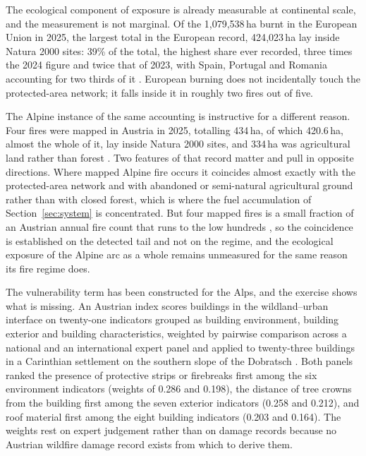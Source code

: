 \documentclass[11pt,a4paper]{article}
\begin{document}
The ecological component of exposure is already measurable at continental scale, and the measurement is not marginal. Of the 1{,}079{,}538\,ha burnt in the European Union in 2025, the largest total in the European record, 424{,}023\,ha lay inside Natura 2000 sites: 39\% of the total, the highest share ever recorded, three times the 2024 figure and twice that of 2023, with Spain, Portugal and Romania accounting for two thirds of it \citep{jrc_advance_2026}. European burning does not incidentally touch the protected-area network; it falls inside it in roughly two fires out of five.

The Alpine instance of the same accounting is instructive for a different reason. Four fires were mapped in Austria in 2025, totalling 434\,ha, of which 420.6\,ha, almost the whole of it, lay inside Natura 2000 sites, and 334\,ha was agricultural land rather than forest \citep{jrc_advance_2026}. Two features of that record matter and pull in opposite directions. Where mapped Alpine fire occurs it coincides almost exactly with the protected-area network and with abandoned or semi-natural agricultural ground rather than with closed forest, which is where the fuel accumulation of Section~\ref{sec:system} is concentrated. But four mapped fires is a small fraction of an Austrian annual fire count that runs to the low hundreds \citep{papathomakohle_towards_2025}, so the coincidence is established on the detected tail and not on the regime, and the ecological exposure of the Alpine arc as a whole remains unmeasured for the same reason its fire regime does.

The vulnerability term has been constructed for the Alps, and the exercise shows what is missing. An Austrian index scores buildings in the wildland--urban interface on twenty-one indicators grouped as building environment, building exterior and building characteristics, weighted by pairwise comparison across a national and an international expert panel and applied to twenty-three buildings in a Carinthian settlement on the southern slope of the Dobratsch \citep{papathomakohle_towards_2025}. Both panels ranked the presence of protective strips or firebreaks first among the six environment indicators (weights of 0.286 and 0.198), the distance of tree crowns from the building first among the seven exterior indicators (0.258 and 0.212), and roof material first among the eight building indicators (0.203 and 0.164). The weights rest on expert judgement rather than on damage records because no Austrian wildfire damage record exists from which to derive them.
\end{document}
